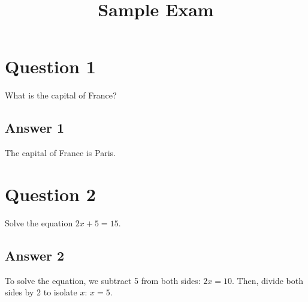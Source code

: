 \documentclass{article}
\newcommand{\question}[1]{\section*{Question #1}}
\newcommand{\answer}[1]{\subsection*{Answer #1}}
\begin{document}
\title{Sample Exam}
\date{}
\maketitle

\question{1} %
What is the capital of France? %

\answer{1} %
The capital of France is Paris. %

\question{2} %
Solve the equation $2x + 5 = 15$. %

\answer{2} %
To solve the equation, we subtract 5 from both sides: $2x = 10$. Then, divide both sides by 2 to isolate $x$: $x = 5$. %

\end{document}
